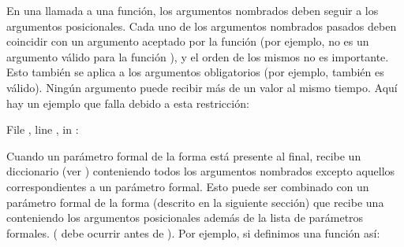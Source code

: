 \documentclass[a4,10pt,spanish]{sphinxmanual}
\begin{document}
\sphinxAtStartPar
En una llamada a una función, los argumentos nombrados deben seguir a los argumentos posicionales. Cada uno de los argumentos nombrados pasados deben coincidir con un argumento aceptado por la función (por ejemplo,  no es un argumento válido para la función ), y el orden de los mismos no es importante. Esto también se aplica a los argumentos obligatorios (por ejemplo,  también es válido). Ningún argumento puede recibir más de un valor al mismo tiempo. Aquí hay un ejemplo que falla debido a esta restricción:

\begin{sphinxVerbatim}[commandchars=\\\{\}]
 
    
 
  File , line , in 
: 
\end{sphinxVerbatim}

\sphinxAtStartPar
Cuando un parámetro formal de la forma  está presente al final, recibe un diccionario (ver ) conteniendo todos los argumentos nombrados excepto aquellos correspondientes a un parámetro formal. Esto puede ser combinado con un parámetro formal de la forma  (descrito en la siguiente sección) que recibe una {\hyperref[\detokenize{tutorial/datastructures:tut-tuples}]{}} conteniendo los argumentos posicionales además de la lista de parámetros formales. ( debe ocurrir antes de ). Por ejemplo, si definimos una función así:
\end{document}
